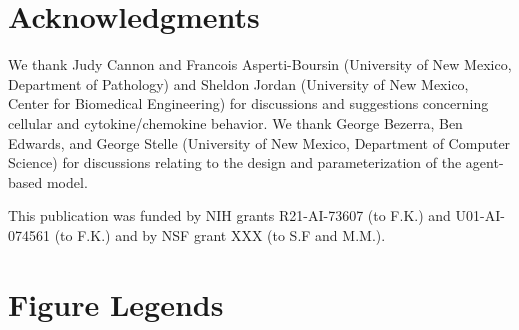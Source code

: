 \documentclass[10pt]{article}
\begin{document}
\section*{Acknowledgments}

We thank Judy Cannon and Francois Asperti-Boursin (University of New Mexico, Department of Pathology) and Sheldon Jordan (University of New Mexico, Center for Biomedical Engineering) for discussions and suggestions concerning cellular and cytokine/chemokine behavior.  We thank George Bezerra, Ben Edwards, and George Stelle (University of New Mexico, Department of Computer Science) for discussions relating to the design and parameterization of the agent-based model.

This publication was funded by NIH grants R21-AI-73607 (to F.K.) and U01-AI-074561 (to F.K.) and by NSF grant XXX (to S.F and M.M.).



\section*{Figure Legends}
\end{document}
